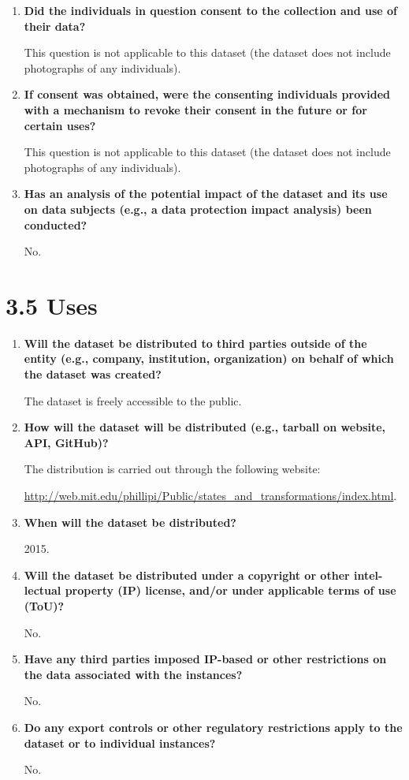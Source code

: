 \documentclass[a4paper,12pt]{article}
\begin{document}
\begin{enumerate}
    \item \textbf{Did the individuals in question consent to the collection and use
    of their data?}

    This question is not applicable to this dataset (the dataset does not include photographs of any individuals).

    \item \textbf{If consent was obtained, were the consenting individuals provided with a mechanism to revoke their consent in the future or for certain uses?}
    
    This question is not applicable to this dataset (the dataset does not include photographs of any individuals).

    \item \textbf{Has an analysis of the potential impact of the dataset and its use
    on data subjects (e.g., a data protection impact analysis) been conducted?}

    No.

\end{enumerate}



\section*{3.5 Uses}

\begin{enumerate}
    \item \textbf{Will the dataset be distributed to third parties outside of the entity (e.g., company, institution, organization) on behalf of which
    the dataset was created?}

    The dataset is freely accessible to the public.

    \item \textbf{How will the dataset will be distributed (e.g., tarball on website,
    API, GitHub)? }

    The distribution is carried out through the following website: 
    
    \url{http://web.mit.edu/phillipi/Public/states_and_transformations/index.html}.

    \item \textbf{When will the dataset be distributed?}
    
    2015.

    \item \textbf{Will the dataset be distributed under a copyright or other intel-
    lectual property (IP) license, and/or under applicable terms of use
    (ToU)?}

    No.

    \item \textbf{Have any third parties imposed IP-based or other restrictions on
    the data associated with the instances?}

    No.

    \item \textbf{Do any export controls or other regulatory restrictions apply to
    the dataset or to individual instances?}

    No.

\end{enumerate}
\end{document}
